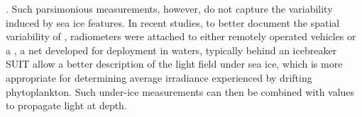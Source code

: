 {{\citep{Mundy2009}}\hspace{0pt}%
. Such parsimonious }\DIFdelend \DIFaddbegin {}\DIFaddend measurements, however, do not capture the variability induced by sea ice features. In recent studies, to better document the spatial variability of \edz{}, radiometers were attached to either remotely operated vehicles \DIFaddbegin {}\DIFaddend \citep{Katlein2015} or a \DIFdelbegin {}\DIFdelend \DIFaddbegin {}\DIFaddend , a net developed for deployment in \DIFdelbegin {}\DIFdelend \DIFaddbegin {}\DIFaddend waters, typically behind an icebreaker \DIFdelbegin {}\DIFdelend \DIFaddbegin {}\DIFaddend SUIT allow a better description of the light field \DIFaddbegin {}\DIFaddend under sea ice, which is more appropriate for determining average irradiance experienced by drifting phytoplankton. Such under-ice measurements can then be combined with \DIFaddbegin {}\DIFaddend \ked{} values to propagate light at depth.

